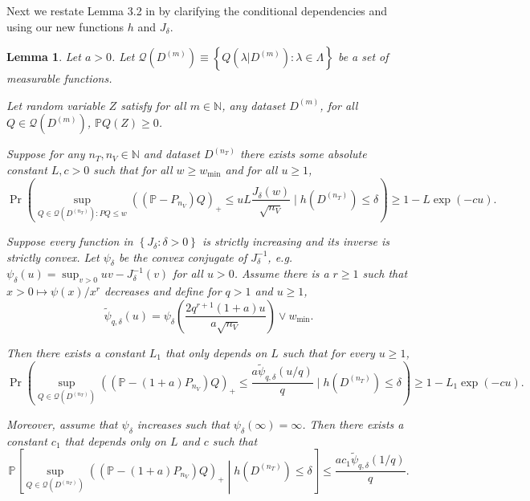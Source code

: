 \documentclass[10pt]{book}
\newtheorem{lemma}{Lemma}
\theoremstyle{definition}
\begin{document}
Next we restate Lemma 3.2 in \citet{lecue2012oracle} by clarifying the conditional dependencies and using our new functions $h$ and $J_\delta$.
\begin{lemma}
	Let $a>0$. Let $\mathcal{Q}(D^{(m)})\equiv\left\{ Q(\lambda|D^{(m)}):\lambda\in\Lambda\right\} $
	be a set of measurable functions.
	
	Let random variable $Z$ satisfy for all $m\in\mathbb{N}$, any dataset
	$D^{(m)}$, for all $Q\in\mathcal{Q}\left(D^{(m)}\right)$, $\mathbb{P}Q(Z)\ge 0 $.
	
	Suppose for any $n_{T},n_{V}\in\mathbb{N}$ and dataset $D^{(n_{T})}$
	there exists some absolute constant $L,c>0$ such that for all $w\ge w_{\min}$
	and for all $u\ge1$,
	\[
	\Pr\left(
	\sup_{Q\in\mathcal{Q}(D^{(n_{T})}): PQ \le w}
	\left(\left(\mathbb{P}-P_{n_{V}}\right)Q\right)_{+}\le uL\frac{J_{\delta}(w)}{\sqrt{n_{V}}}\mid h\left(D^{(n_{T})}\right)\le\delta\right)
	\ge 1-L\exp(-cu).
	\]
	
	
	Suppose every function in $\left\{ J_{\delta}:\delta>0\right\} $
	is strictly increasing and its inverse is strictly convex.
	Let $\psi_{\delta}$ be the convex conjugate of $J_{\delta}^{-1}$,
	e.g. $\psi_{\delta}(u)=\sup_{v>0}uv-J_{\delta}^{-1}(v)$ for all $u>0$.
	Assume there is a $r\ge1$ such that $x>0\mapsto\psi(x)/x^{r}$ decreases
	and define for $q>1$ and $u\ge1$,
	\[
	\tilde \psi_{q,\delta}(u)=\psi_{\delta}\left(\frac{2q^{r+1}(1+a)u}{a\sqrt{n_{V}}}\right)\vee w_{\min}.
	\]
	
	
	Then there exists a constant $L_{1}$ that only depends on $L$ such
	that for every $u\ge1$,
	\[
	\Pr\left(
	\sup_{Q\in\mathcal{Q}(D^{(n_{T})})}
	\left(\left(\mathbb{P}-(1+a)P_{n_{V}}\right)Q\right)_{+}
	\le \frac{a \tilde{\psi}_{q,\delta}(u/q)}{q}\mid h\left(D^{(n_{T})}\right)\le\delta
	\right)
	\ge 1-L_{1}\exp(-cu).
	\]
	
	
	Moreover, assume that $\psi_{\delta}$ increases such that $\psi_{\delta}(\infty)=\infty$.
	Then there exists a constant $c_{1}$ that depends only on $L$ and $c$ such that
	\[
	\mathbb{P}\left[\sup_{Q\in\mathcal{Q}(D^{(n_{T})})}
	\left(\left(\mathbb{P}-(1+a)P_{n_{V}}\right)Q\right)_{+}
	\middle |
	h\left(D^{(n_{T})}\right)\le\delta
	\right]
	\le\frac{ac_{1} \tilde{\psi}_{q,\delta}(1/q)}{q}.
	\]
\end{lemma}
\end{document}
